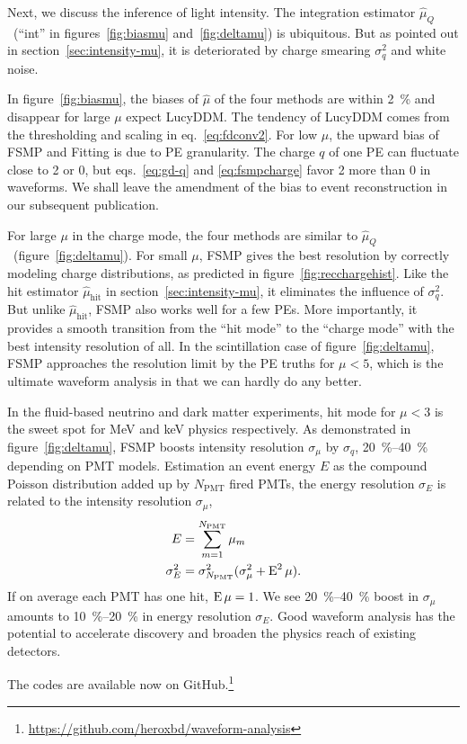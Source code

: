 Next, we discuss the inference of light intensity.  The integration estimator $\hat{\mu}_Q$~(``int'' in figures~\ref{fig:biasmu} and~\ref{fig:deltamu}) is ubiquitous.  But as pointed out in section~\ref{sec:intensity-mu}, it is deteriorated by charge smearing $\sigma_q^2$ and white noise.

In figure~\ref{fig:biasmu}, the biases of $\hat{\mu}$ of the four methods are within \SI{2}{\percent} and disappear for large $\mu$ expect LucyDDM.  The tendency of LucyDDM comes from the thresholding and scaling in eq.~\eqref{eq:fdconv2}.  For low $\mu$, the upward bias of FSMP and Fitting is due to PE granularity.  The charge $q$ of one PE can fluctuate close to 2 or 0, but eqs.~\eqref{eq:gd-q} and \eqref{eq:fsmpcharge} favor 2 more than 0 in waveforms.  We shall leave the amendment of the bias to event reconstruction in our subsequent publication.

For large $\mu$ in the charge mode, the four methods are similar to $\hat{\mu}_Q$~(figure~\ref{fig:deltamu}).  For small $\mu$, FSMP gives the best resolution by correctly modeling charge distributions, as predicted in figure~\ref{fig:recchargehist}.  Like the hit estimator $\hat{\mu}_\mathrm{hit}$ in section~\ref{sec:intensity-mu}, it eliminates the influence of $\sigma_q^2$. But unlike $\hat{\mu}_\mathrm{hit}$, FSMP also works well for a few PEs.  More importantly, it provides a smooth transition from the ``hit mode'' to the ``charge mode'' with the best intensity resolution of all.   In the scintillation case of figure~\ref{fig:deltamu}, FSMP approaches the resolution limit by the PE truths for $\mu < 5$, which is the ultimate waveform analysis in that we can hardly do any better.

In the fluid-based neutrino and dark matter experiments, hit mode for $\mu < 3$ is the sweet spot for \si{MeV} and \si{keV} physics respectively.  As demonstrated in figure~\ref{fig:deltamu}, FSMP boosts intensity resolution $\sigma_\mu$ by $\sigma_q$, \SIrange{20}{40}{\percent} depending on PMT models.  Estimation an event energy $E$ as the compound Poisson distribution added up by $N_\mathrm{PMT}$ fired PMTs, the energy resolution $\sigma_E$ is related to the intensity resolution $\sigma_\mu$,
\begin{equation}
  \label{eq:energy}
  \begin{aligned}
    E &= \sum_{m=1}^{N_\mathrm{PMT}} \mu_m \\
    \sigma_E^2 &= \sigma_{N_\mathrm{PMT}}^2 (\sigma^2_\mu + \operatorname{E}^2\mu). \\
  \end{aligned}
\end{equation}
If on average each PMT has one hit, $\operatorname{E}\mu=1$.  We see \SIrange{20}{40}{\percent} boost in $\sigma_\mu$ amounts to \SIrange{10}{20}{\percent} in energy resolution $\sigma_E$.  Good waveform analysis has the potential to accelerate discovery and broaden the physics reach of existing detectors. 

The codes are available now on GitHub.\footnote{\url{https://github.com/heroxbd/waveform-analysis}}